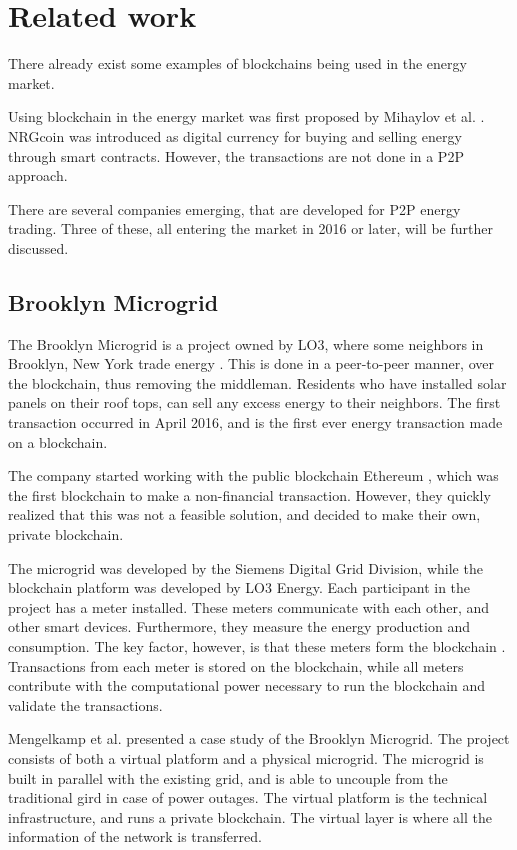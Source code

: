 \chapter{Related work}
There already exist some examples of blockchains being used in the energy market.  

Using blockchain in the energy market was first proposed by Mihaylov et al. \cite{NRGcoin_Mihaylov}. NRGcoin was introduced as digital currency for buying and selling energy through smart contracts. However, the transactions are not done in a P2P approach. 
 
There are several companies emerging, that are developed for P2P energy trading. Three of these, all entering the market in 2016 or later, will be further discussed. 


\section{Brooklyn Microgrid} \label{Brooklyn}
The Brooklyn Microgrid is a project owned by LO3, where some neighbors in Brooklyn, New York trade energy  \cite{bm101}. This is done in a peer-to-peer manner, over the blockchain, thus removing the middleman. Residents who have installed solar panels on their roof tops, can sell any excess energy to their neighbors. The first transaction occurred in April 2016, and is \cite{exergy, motherboard_bm} the first ever energy transaction made on a blockchain. 

The company started working with the public blockchain Ethereum \cite{medium_bm, motherboard_bm}, which was the first blockchain to make a non-financial transaction. However, they quickly realized that this was not a feasible solution, and decided to make their own, private blockchain.

The microgrid was developed by the Siemens Digital Grid Division, while the blockchain platform was developed by LO3 Energy. 
Each participant in the project has a meter installed. These meters communicate with each other, and other smart devices. Furthermore, they measure the energy production and consumption. The key factor, however, is that these meters form the blockchain \cite{medium_bm, hbr_grid}. Transactions from each meter is stored on the blockchain, while all meters contribute with the computational power necessary to run the blockchain and validate the transactions. 

Mengelkamp et al. \cite{Brooklyn_Mengelkamp} presented a case study of the Brooklyn Microgrid. The project consists of both a virtual platform and a physical microgrid. The microgrid is built in parallel with the existing grid, and is able to uncouple from the traditional gird in case of power outages. The virtual platform is the technical infrastructure, and runs a private blockchain. The virtual layer is where all the information of the network is transferred. 


